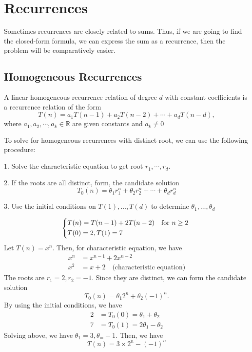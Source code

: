\chapter{Recurrences}

Sometimes recurrences are closely related to sums. Thus, if we are going to find the closed-form formula, we can express the sum as a recurrence, then the problem will be comparatively easier.

\section{Homogeneous Recurrences}
\begin{definition}
    A linear homogeneous recurrence relation of degree \(d\) with constant coefficients is a recurrence relation of the form
    \[
        T(n) = a_1 T(n-1) + a_2 T(n-2) + \cdots + a_d T(n-d) ,
    \]
    where \(a_1, a_2, \cdots, a_k \in \mathbb{R}\) are given constants and \(a_k \neq  0\) 
\end{definition}

To solve for homogeneous recurrences with distinct root, we can use the following procedure:

1. Solve the characteristic equation to get root \(r_1, \cdots, r_d\).

2. If the roots are all distinct, form, the candidate solution
\[
    T_0(n) = \theta_1 r_1^n + \theta_2 r_2^n + \cdots + \theta_d r_d^n
\]

3. Use the initial conditions on \(T(1), \dots, T(d)\) to determine \(\theta_1, \dots, \theta_d\) 

\begin{eg}
    \[
        \begin{dcases}
            T(n) = T(n - 1) + 2T(n - 2)\quad\text{for \(n \geq  2\) }\\
            T(0) = 2, T(1) = 7
        \end{dcases}
    \]
    Let \(T(n) = x^n\). Then, for characteristic equation, we have
    \[
    \begin{aligned}
        x^n &= x^{n-1} + 2x^{n-2} \\
        x^2 &= x + 2 \quad \text{(characteristic equation)}
    \end{aligned}
    \]
    The roots are \(r_1 = 2, r_2 = -1\). Since they are distinct, we can form the candidate solution
    \[
        T_0(n) = \theta_1 2^n + \theta_2 (-1)^n.
    \]
    By using the initial conditions, we have
    \[
        \begin{aligned}
            2 &= T_0(0) = \theta_1 + \theta_2 \\
            7 &= T_0(1) = 2\theta_1 - \theta_2
        \end{aligned}
    \]
    Solving above, we have \(\theta_1 = 3, \theta_ = -1\). Then, we have
    \[
        T(n) = 3 \times 2^n - (-1)^n
    \] 
\end{eg}

